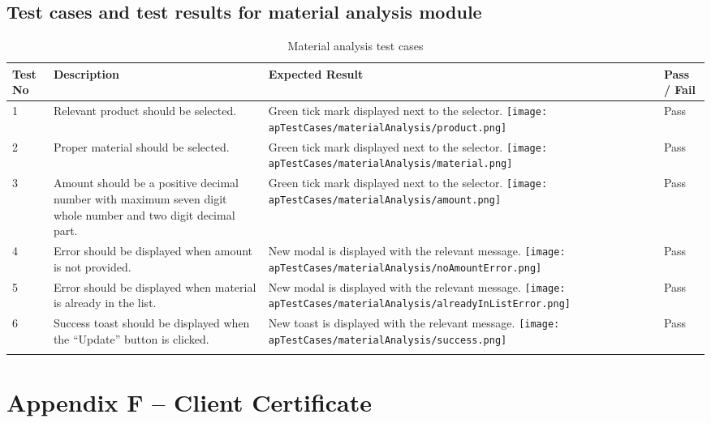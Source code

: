 \documentclass[12pt]{report}
\begin{document}
\section{Test cases and test results for material analysis module}

\begin{longtable}{ | p{1cm} | p{5cm} | p{5cm} | p{2cm} | }
	\hline
	\bf{Test No} & \bf{Description} & \bf{Expected Result} & \bf{Pass / Fail} \\
	\hline
	1
	             &
	Relevant product should be selected.
	             &
	Green tick mark displayed next to the selector.\newline
	\texttt{[image: apTestCases/materialAnalysis/product.png]}
	             &
	Pass                                                                      \\
	\hline
	2
	             &
	Proper material should be selected.
	             &
	Green tick mark displayed next to the selector.\newline
	\texttt{[image: apTestCases/materialAnalysis/material.png]}
	             &
	Pass                                                                      \\
	\hline
	3
	             &
	Amount should be a positive decimal number with maximum seven digit whole number and two digit decimal part.
	             &
	Green tick mark displayed next to the selector.\newline
	\texttt{[image: apTestCases/materialAnalysis/amount.png]}
	             &
	Pass                                                                      \\
	\hline
	4
	             &
	Error should be displayed when amount is not provided.
	             &
	New modal is displayed with the relevant message.\newline
	\texttt{[image: apTestCases/materialAnalysis/noAmountError.png]}
	             &
	Pass                                                                      \\
	\hline
	5
	             &
	Error should be displayed when material is already in the list.
	             &
	New modal is displayed with the relevant message.\newline
	\texttt{[image: apTestCases/materialAnalysis/alreadyInListError.png]}
	             &
	Pass                                                                      \\
	\hline
	6
	             &
	Success toast should be displayed when the ``Update'' button is clicked.
	             &
	New toast is displayed with the relevant message.\newline
	\texttt{[image: apTestCases/materialAnalysis/success.png]}
	             &
	Pass                                                                      \\
	\hline
	\caption{Material analysis test cases}
\end{longtable}



\chapter*{\Huge Appendix F – Client Certificate}
\end{document}

